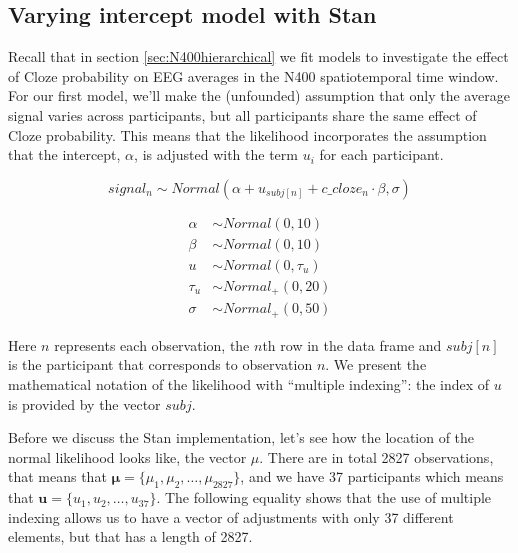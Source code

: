 \documentclass[12pt,]{krantz}
\theoremstyle{definition}
\theoremstyle{definition}
\theoremstyle{definition}
\theoremstyle{remark}
\begin{document}
\hypertarget{varying-intercept-model-with-stan}{%
\subsection{Varying intercept model with Stan}\label{varying-intercept-model-with-stan}}

Recall that in section \ref{sec:N400hierarchical} we fit models to investigate the effect of Cloze probability on EEG averages in the N400 spatiotemporal time window. For our first model, we'll make the (unfounded) assumption that only the average signal varies across participants, but all participants share the same effect of Cloze probability. This means that the likelihood incorporates the assumption that the intercept, \(\alpha\), is adjusted with the term \(u_i\) for each participant.

\begin{equation}
  signal_n \sim Normal(\alpha + u_{subj[n]} + c\_cloze_n \cdot \beta,\sigma)
\end{equation}

\begin{equation}
 \begin{aligned}
 \alpha &\sim Normal(0,10)\\
 \beta  &\sim Normal(0,10)\\
 u &\sim Normal(0,\tau_u)\\
 \tau_{u} &\sim Normal_+(0,20) \\
 \sigma  &\sim Normal_+(0,50)
 \end{aligned}
 \end{equation}

Here \(n\) represents each observation, the \(n\)th row in the data frame and \(subj[n]\) is the participant that corresponds to observation \(n\). We present the mathematical notation of the likelihood with ``multiple indexing'': the index of \(u\) is provided by the vector \(subj\).

Before we discuss the Stan implementation, let's see how the location of the normal likelihood looks like, the vector \(\mu\). There are in total 2827 observations, that means that \(\boldsymbol{\mu}=\{\mu_1,\mu_2, \ldots, \mu_{2827}\}\), and we have 37 participants which means that \(\boldsymbol{u}=\{u_1,u_2, \ldots, u_{37}\}\). The following equality shows that the use of multiple indexing allows us to have a vector of adjustments with only 37 different elements, but that has a length of 2827.
\end{document}
